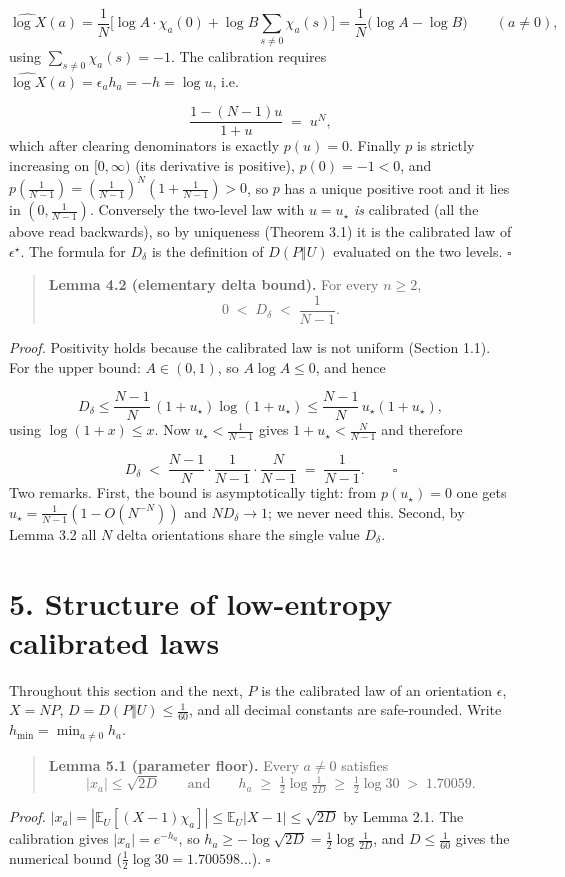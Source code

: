 \documentclass[11pt]{article}
\begin{document}
\[
\widehat{\log X}(a)
= \frac1N\Big[\log A \cdot \chi_a(0) + \log B \sum_{s \ne 0}
\chi_a(s)\Big]
= \frac1N\big(\log A - \log B\big)
\qquad (a \ne 0),
\]
using $\sum_{s\ne0}\chi_a(s) = -1$.  The calibration requires $\widehat{\log X}(a) = \epsilon_a h_a = -h = \log u$, i.e.

\[
\frac{1 - (N-1)u}{1+u} \;=\; u^N ,
\]
which after clearing denominators is exactly $p(u) = 0$.  Finally $p$ is strictly increasing on $[0,\infty)$ (its derivative is positive), $p(0) = -1 < 0$, and $p(\tfrac1{N-1}) = (\tfrac1{N-1})^{N}(1 + \tfrac1{N-1}) > 0$, so $p$ has a unique positive root and it lies in $(0, \tfrac1{N-1})$.  Conversely the two-level law with $u = u_\star$ \emph{is} calibrated (all the above read backwards), so by uniqueness (Theorem 3.1) it is the calibrated law of $\epsilon^\star$.  The formula for $D_\delta$ is the definition of $D(P\Vert U)$ evaluated on the two levels.  $\square$

\begin{quote}
\textbf{Lemma 4.2 (elementary delta bound).}  For every $n \ge 2$,
\[
0 \;<\; D_\delta \;<\; \frac{1}{N-1} .
\]
\end{quote}
\emph{Proof.}  Positivity holds because the calibrated law is not uniform (Section 1.1).  For the upper bound: $A \in (0,1)$, so $A\log A \le 0$, and hence

\[
D_\delta \le \frac{N-1}{N}\,(1+u_\star)\log(1+u_\star)
\le \frac{N-1}{N}\,u_\star(1+u_\star),
\]
using $\log(1+x) \le x$.  Now $u_\star < \frac1{N-1}$ gives $1 + u_\star < \frac{N}{N-1}$ and therefore

\[
D_\delta \;<\; \frac{N-1}{N}\cdot\frac{1}{N-1}\cdot\frac{N}{N-1}
\;=\; \frac{1}{N-1}. \qquad \square
\]
Two remarks.  First, the bound is asymptotically tight: from $p(u_\star) = 0$ one gets $u_\star = \frac1{N-1}(1 - O(N^{-N}))$ and $N D_\delta \to 1$; we never need this.  Second, by Lemma 3.2 all $N$ delta orientations share the single value $D_\delta$.

\section*{5. Structure of low-entropy calibrated laws}
Throughout this section and the next, $P$ is the calibrated law of an orientation $\epsilon$, $X = NP$, $D = D(P\Vert U) \le \frac{1}{60}$, and all decimal constants are safe-rounded.  Write $h_{\min} = \min_{a\ne0} h_a$.

\begin{quote}
\textbf{Lemma 5.1 (parameter floor).}  Every $a \ne 0$ satisfies
\[
|x_a| \le \sqrt{2D}
\qquad\text{and}\qquad
h_a \;\ge\; \tfrac12 \log\tfrac{1}{2D}
\;\ge\; \tfrac12\log 30 \;>\; 1.70059 .
\]
\end{quote}
\emph{Proof.}  $|x_a| = |\mathbb{E}_U[(X-1)\chi_a]| \le \mathbb{E}_U|X-1| \le \sqrt{2D}$ by Lemma 2.1.  The calibration gives $|x_a| = e^{-h_a}$, so $h_a \ge -\log\sqrt{2D} = \frac12\log\frac1{2D}$, and $D \le \frac1{60}$ gives the numerical bound ($\frac12\log 30 = 1.700598\ldots$).  $\square$
\end{document}
